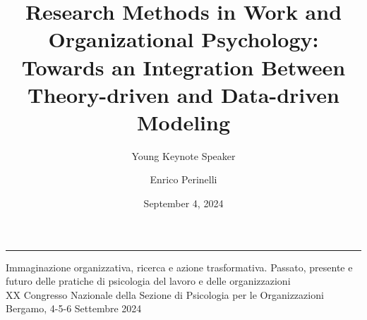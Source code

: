 \documentclass{beamer}
\title[Research Methods in WOP - AIP Young Keynote]{Research Methods in Work and Organizational Psychology: Towards an Integration Between Theory-driven and Data-driven Modeling}
\subtitle{Young Keynote Speaker}
\author{Enrico Perinelli}
\institute{Department of Psychology and Cognitive Science \\ University of Trento}
\date{September 4, 2024}
\begin{document}

\begin{frame}
    \titlepage
    \begin{center}
    \hspace{0\linewidth}\rule{1\linewidth}{0.2pt}
    \begin{tiny}
        Immaginazione organizzativa, ricerca e azione trasformativa. Passato, presente e futuro delle pratiche di psicologia del lavoro e delle organizzazioni\\
        XX Congresso Nazionale della Sezione di Psicologia per le Organizzazioni\\
        Bergamo, 4-5-6 Settembre 2024
    \end{tiny}
    \end{center}
\end{frame}
\end{document}
